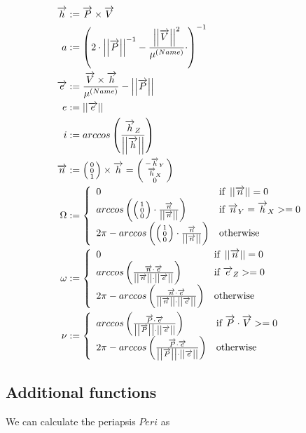 \documentclass[11pt]{article}
\newcommand{\oa}[1]{\overrightarrow{#1}}
\newcommand{\Pos}{\oa{P}}
\newcommand{\Vel}{\oa{V}}
\newcommand{\absvec}[1]{\left|\left|{#1}\right|\right|}
\newcommand{\dddvec}[3]{\left(\begin{smallmatrix}{#1}\\{#2}\\{#3}\end{smallmatrix}\right)}
\begin{document}
\begin{align}
  \oa{h} &:= \Pos \times \Vel\nonumber\\
  a &:= \left(2\cdot\absvec{\Pos}^{-1} - \frac{\absvec{\Vel}^2}{\mu^{(Name)}}\cdot \right)^{-1}\\
  \oa{e} &:= \frac{\Vel\times \oa{h}}{\mu^{(Name)}} - \absvec{\Pos}\nonumber\\
  e &:= \absvec{\oa{e}}\\
  i &:= arccos\left(\frac{\oa{h}_Z}{\absvec{\oa{h}}} \right)\\
  \oa{n} & := \dddvec{0}{0}{1} \times \oa{h} = \dddvec{-\oa{h}_Y}{\oa{h}_X}{0}\nonumber\\
  \Omega &:= \left\{
    \begin{array}{l l}
      0 & \textrm{if } \absvec{\oa{n}} = 0\\
      arccos\left(\dddvec{1}{0}{0}\cdot\frac{\oa{n}}{\absvec{\oa{n}}} \right) & \textrm{if } \oa{n}_Y = \oa{h}_X >= 0\\
      2\pi - arccos\left(\dddvec{1}{0}{0}\cdot\frac{\oa{n}}{\absvec{\oa{n}}} \right) & \textrm{otherwise}
    \end{array}
    \right.\\
  \omega & := \left\{
    \begin{array}{l l}
      0 & \textrm{if } \absvec{\oa{n}} = 0\\
      arccos\left(\frac{\oa{n}\cdot\oa{e}}{\absvec{\oa{n}}\cdot\absvec{\oa{e}}} \right) & \textrm{if } \oa{e}_Z >= 0\\
      2\pi - arccos\left(\frac{\oa{n}\cdot\oa{e}}{\absvec{\oa{n}}\cdot\absvec{\oa{e}}}\right) & \textrm{otherwise}
    \end{array}
    \right.\\
    \nu &:= \left\{
    \begin{array}{l l}
      arccos\left(\frac{\Pos\cdot\oa{e}}{\absvec{\Pos}\cdot\absvec{\oa{e}}}\right) & \textrm{if } \Pos\cdot\Vel >= 0\\
      2\pi - arccos\left(\frac{\Pos\cdot\oa{e}}{\absvec{\Pos}\cdot\absvec{\oa{e}}}\right) & \textrm{otherwise}
    \end{array}
    \right.
\end{align}

\subsection{Additional functions}

We can calculate the periapsis $Peri$ as
\end{document}
